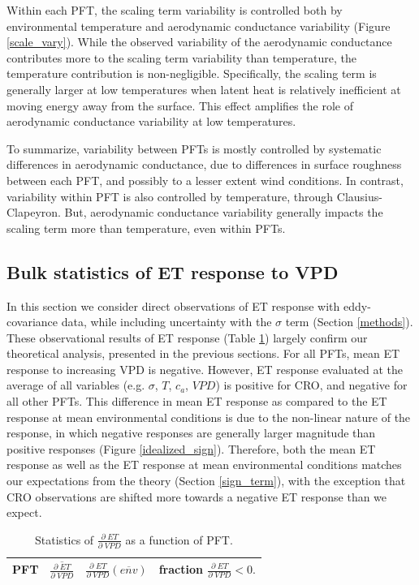 Within each PFT, the scaling term variability is controlled both by
environmental temperature and aerodynamic conductance variability
(Figure \ref{scale_vary}). While the observed variability of the
aerodynamic conductance contributes more to the scaling term
variability than temperature, the temperature contribution is
non-negligible. Specifically, the scaling term is generally larger at
low temperatures when latent heat is relatively inefficient at moving
energy away from the surface. This effect amplifies the role of
aerodynamic conductance variability at low temperatures.

To summarize, variability between PFTs is mostly controlled by
systematic differences in aerodynamic conductance, due to differences
in surface roughness between each PFT, and possibly to a lesser extent
wind conditions. In contrast, variability within PFT is also
controlled by temperature, through Clausius-Clapeyron. But,
aerodynamic conductance variability generally impacts the scaling term
more than temperature, even within PFTs.

\subsection{Bulk statistics of ET response to VPD}
\label{stats_sec}

In this section we consider direct observations of ET response with
eddy-covariance data, while including uncertainty with the $\sigma$
term (Section \ref{methods}). These observational results of ET
response (Table \ref{stats}) largely confirm our theoretical analysis, presented in the previous sections. For all PFTs, mean ET response to increasing VPD
is negative. However, ET response evaluated at the average of all
variables (e.g. $\sigma$, $T$, $c_a$, $VPD$) is positive for CRO, and
negative for all other PFTs. This difference in mean ET response as
compared to the ET response at mean environmental conditions is due to
the non-linear nature of the response, in which negative responses are
generally larger magnitude than positive responses (Figure
\ref{idealized_sign}). Therefore, both the mean ET response as well as
the ET response at mean environmental conditions matches our
expectations from the theory (Section \ref{sign_term}), with the
exception that CRO observations are shifted more towards a negative ET
response than we expect.

\begin{table}
  \caption{Statistics of $\frac{\partial \; ET}{\partial \; VPD}$ as a
    function of PFT.}
  \centering
  \begin{tabular}{l c c c}
    \hline
    PFT & $\overline{\frac{\partial \; ET}{\partial \; VPD}}$ & $\frac{\partial \; ET}{\partial \; VPD}\left(\overline{env}\right)$ & fraction $\frac{\partial \; ET}{\partial \; VPD} < 0.$ \\
    \hline
    
    \hline
  \end{tabular}
  \label{stats}
\end{table}

